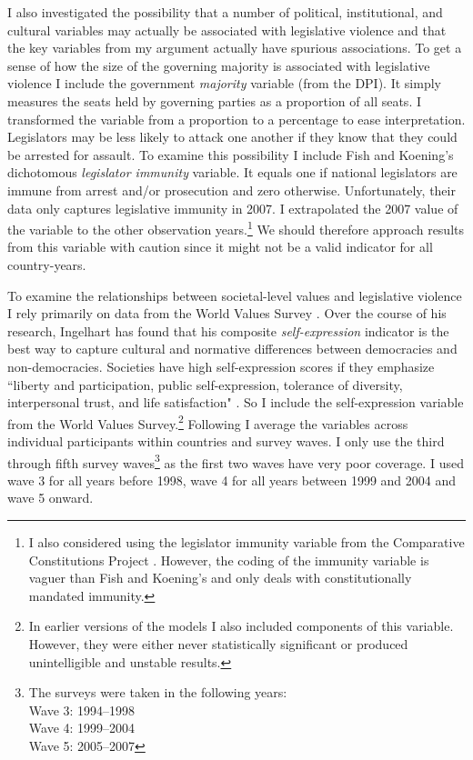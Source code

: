 \documentclass[a4paper]{article}\usepackage[]{graphicx}\usepackage[]{color}
\begin{document}
I also investigated the possibility that a number of political, institutional, and cultural variables may actually be associated with legislative violence and that the key variables from my argument actually have spurious associations. To get a sense of how the size of the governing majority is associated with legislative violence I include the government {\emph{majority}} variable (from the DPI). It simply measures the seats held by governing parties as a proportion of all seats. I transformed the variable from a proportion to a percentage to ease interpretation. Legislators may be less likely to attack one another if they know that they could be arrested for assault. To examine this possibility I include Fish and Koening's \citeyearpar{Fish2009} dichotomous \emph{legislator immunity} variable. It equals one if national legislators are immune from arrest and/or prosecution and zero otherwise. Unfortunately, their data only captures legislative immunity in 2007. I extrapolated the 2007 value of the variable to the other observation years.\footnote{I also considered using the legislator immunity variable from the Comparative Constitutions Project \citep{ElkinsCCP2010}. However, the coding of the immunity variable is vaguer than Fish and Koening's and only deals with constitutionally mandated immunity.} We should therefore approach results from this variable with caution since it might not be a valid indicator for all country-years.

To examine the relationships between societal-level values and legislative violence I rely primarily on data from the World Values Survey \citeyearpar{WVS2009}. Over the course of his research, Ingelhart has found that his composite {\emph{self-expression}} indicator is the best way to capture cultural and normative differences between democracies and non-democracies. Societies have high self-expression scores if they emphasize ``liberty and participation, public self-expression, tolerance of diversity, interpersonal trust, and life satisfaction" \citep[64]{Inglehart2003}. So I include the self-expression variable from the World Values Survey.\footnote{In earlier versions of the models I also included components of this variable. However, they were either never statistically significant or produced unintelligible and unstable results.} Following \cite{Inglehart2003} I average the variables across individual participants within countries and survey waves. I only use the third through fifth survey waves\footnote{The surveys were taken in the following years: \\ Wave 3: 1994--1998 \\ Wave 4: 1999--2004 \\ Wave 5: 2005--2007} as the first two waves have very poor coverage. I used wave 3 for all years before 1998, wave 4 for all years between 1999 and 2004 and wave 5 onward.
\end{document}
